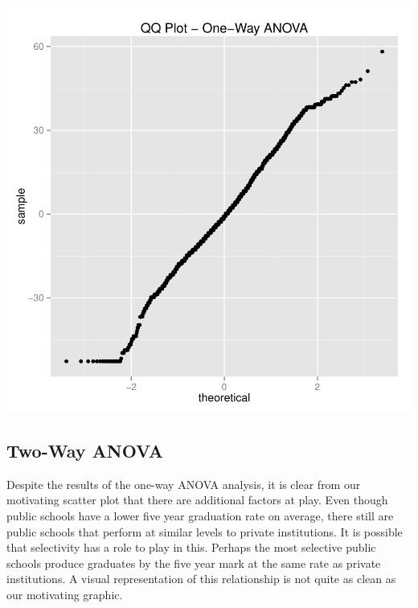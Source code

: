 \documentclass{article}
\begin{document}
\includegraphics{Fig-anotherdamnqq}

\FloatBarrier

\subsection{Two-Way ANOVA}

Despite the results of the one-way ANOVA analysis, it is clear from our motivating scatter plot that there are additional factors at play. Even though public schools have a lower five year graduation rate on average, there still are public schools that perform at similar levels to private institutions. It is possible that selectivity has a role to play in this. Perhaps the most selective public schools produce graduates by the five year mark at the same rate as private institutions. A visual representation of this relationship is not quite as clean as our motivating graphic.
\end{document}
